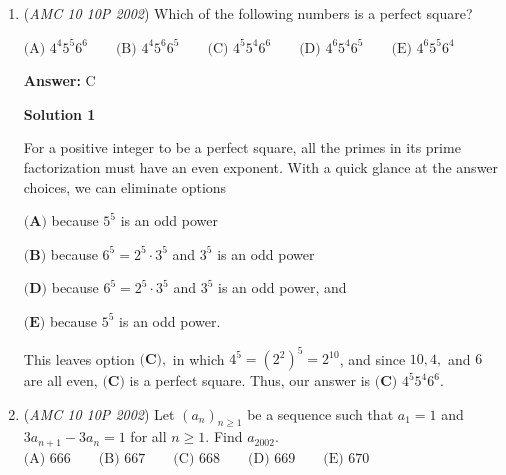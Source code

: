 \begin{enumerate}
 $\dots$

 This continues as the answer comes to

 $5 + 4 + 3 + 2 + 1 = \frac{5(6)}{2}=3(5)=15.$

 Thus, our answer is $\boxed{\textbf{(D) } 15}.$




\textbf{Solution 3}

We can just count the cases directly since there are so little.

 Thus, our answer is $\boxed{\textbf{(D) } 15}.$




\textbf{Solution 4}

We can split into steps. $2002$ has $5$ spaces to place the first $1$, and WLOG $12002$ to find $6$ spaces for next $1$. As the $1$s are not distinct, we divide our answer by $2$ to get $\frac{5*6}{2}=\boxed{\textbf{(D) } 15}.$



	\item (\textit{AMC 10 10P 2002}) Which of the following numbers is a perfect square?


 $\text{(A) }4^4 5^5 6^6 \qquad \text{(B) }4^4 5^6 6^5 \qquad \text{(C) }4^5 5^4 6^6 \qquad \text{(D) }4^6 5^4 6^5 \qquad \text{(E) }4^6 5^5 6^4$

 \textbf{Answer: }C



\textbf{Solution 1}

For a positive integer to be a perfect square, all the primes in its prime factorization must have an even exponent. With a quick glance at the answer choices, we can eliminate options

 $\textbf{(A)}$ because $5^5$ is an odd power

 $\textbf{(B)}$ because $6^5 = 2^5 \cdot 3^5$ and $3^5$ is an odd power

 $\textbf{(D)}$ because $6^5 = 2^5 \cdot 3^5$ and $3^5$ is an odd power, and

 $\textbf{(E)}$ because $5^5$ is an odd power.

 This leaves option $\textbf{(C)},$ in which $4^5=(2^{2})^{5}=2^{10}$, and since $10, 4,$ and $6$ are all even, $\textbf{(C)}$ is a perfect square. Thus, our answer is $\boxed{\textbf{(C) } 4^5 5^4 6^6}.$



	\item (\textit{AMC 10 10P 2002}) Let $(a_n)_{n \geq 1}$ be a sequence such that $a_1 = 1$ and $3a_{n+1} - 3a_n = 1$ for all $n \geq 1.$ Find $a_{2002}.$
$\text{(A) }666 \qquad \text{(B) }667 \qquad \text{(C) }668 \qquad \text{(D) }669 \qquad \text{(E) }670$


\end{enumerate}
